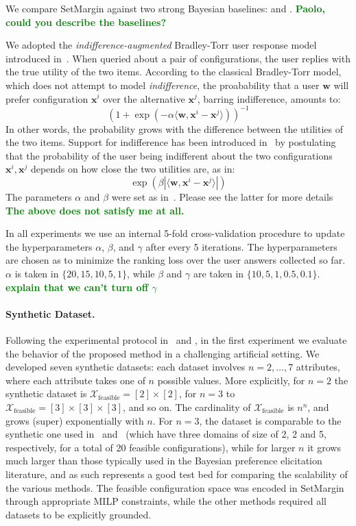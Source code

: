 \documentclass{article}
\renewcommand\[{\begin{equation}}
\renewcommand\]{\end{equation}}
\newcommand{\calvar}[1]{\ensuremath{\mathcal{#1}}}
\newcommand{\calX}{\calvar{X}}
\newcommand{\vecvar}[1]{\ensuremath{\boldsymbol{#1}}}
\newcommand{\vw}{\vecvar{w}}
\newcommand{\vx}{\vecvar{x}}
\newcommand{\stefano}[1]{{\bf \textcolor{green}{{\fbox{Stefano:} #1}}}}
\begin{document}
We compare {\sc SetMargin} against two strong Bayesian baselines:
\cite{guo2010real} and \cite{viappiani2010optimal}.
\stefano{Paolo, could you describe the baselines?}

We adopted the {\em indifference-augmented} Bradley-Torr user response model
introduced in~\cite{guo2010real}. When queried about a pair of configurations,
the user replies with the true utility of the two items. According to the
classical Bradley-Torr model, which does not attempt to model {\em indifference},
the proabability that a user $\vw$ will prefer configuration $\vx^i$ over
the alternative $\vx^j$, barring indifference, amounts to:
%
$$ (1 + \exp(-\alpha \langle\vw,\vx^i - \vx^j\rangle))^{-1} $$
%
In other words, the probability grows with the difference between the utilities
of the two items. Support for indifference has been introduced
in~\cite{guo2010real} by postulating that the probability of the user being
indifferent about the two configurations $\vx^i, \vx^j$ depends on how close
the two utilities are, as in:
%
$$ \exp(\beta |\langle\vw,\vx^i - \vx^j\rangle|) $$
%
The parameters $\alpha$ and $\beta$ were set as in~\cite{guo2010real}. Please
see the latter for more details
\stefano{The above does not satisfy me at all.}

In all experiments we use an internal 5-fold cross-validation procedure to update the
hyperparameters $\alpha$, $\beta$, and $\gamma$ after every 5 iterations. The
hyperparameters are chosen as to minimize the ranking loss over the user
answers collected so far. $\alpha$ is taken in $\{20, 15, 10, 5, 1\}$,
while $\beta$ and $\gamma$ are taken in $\{10, 5, 1, 0.5, 0.1\}$.
\stefano{explain that we can't turn off $\gamma$}

\paragraph{Synthetic Dataset.} Following the experimental protocol
in~\cite{guo2010real} and \cite{viappiani2010optimal}, in the first experiment
we evaluate the behavior of the proposed method in a challenging artificial
setting. We developed seven synthetic datasets: each dataset involves
$n=2,\ldots,7$ attributes, where each attribute takes one of $n$ possible
values. More explicitly, for $n=2$ the synthetic dataset is
$\calX_\text{feasible} = [2] \times [2]$, for $n=3$ to $\calX_\text{feasible} =
[3] \times [3] \times [3]$, and so on. The cardinality of
$\calX_\text{feasible}$ is $n^n$, and grows (super) exponentially with $n$. For
$n=3$, the dataset is comparable to the synthetic one used
in~\cite{guo2010real} and~\cite{viappiani2010optimal} (which have three domains
of size of 2, 2 and 5, respectively, for a total of 20 feasible
configurations), while for larger $n$ it grows much larger than those typically
used in the Bayesian preference elicitation literature, and as such represents
a good test bed for comparing the scalability of the various methods.
The feasible configuration space was encoded in {\sc SetMargin} through
appropriate MILP constraints, while the other methods required all datasets to
be explicitly grounded.
\end{document}
